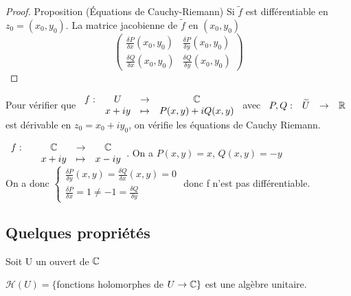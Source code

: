 \documentclass[]{report}
\begin{document}
\begin{proof}{Proposition (Équations de Cauchy-Riemann)}{}
    Si $\widetilde{f}$ est différentiable en $z_0=(x_0,y_0)$. La matrice jacobienne de $\widetilde{f}$ en $(x_0,y_0)$\\
    \[\begin{pmatrix}
\frac{\delta P}{\delta x}(x_0,y_0) & \frac{\delta P}{\delta y}(x_0,y_0) \\
\frac{\delta Q}{\delta x}(x_0,y_0) & \frac{\delta Q}{\delta y}(x_0,y_0)
    \end{pmatrix}\]
\end{proof}

\begin{re}{}{}
    Pour vérifier que $\begin{array}{ccccc}
f : & U & \to & \mathbb{C} \\
  & x+iy & \mapsto & P (x, y) + iQ (x, y)
\end{array}$ avec $\begin{array}{ccccc}P,Q  : & \widetilde{U} & \to & \mathbb{R}\end{array}$ est dérivable en $z_0=x_0+iy_0$, on vérifie les équations de Cauchy Riemann.
\end{re}

\begin{ex}{}{}
    $\begin{array}{ccccc} f : & & \mathbb{C} & \to & \mathbb{C} \\ & & x+iy & \mapsto & x-iy \end{array}$. On a $P(x,y)=x$, $Q(x,y)=-y$\\
On a donc $\begin{cases} \frac{\delta P}{\delta y}(x,y)=\frac{\delta Q}{\delta x}(x,y)=0\\ \frac{\delta P}{\delta x}=1 \neq -1 = \frac{\delta Q}{\delta y} \end{cases}$ donc f n'est pas différentiable.
\end{ex}

\subsection{Quelques propriétés}

Soit U un ouvert de $\mathbb{C}$

\begin{df}{}{}
    $\mathcal{H}(U)=\{$fonctions holomorphes de $U \to \mathbb{C} \}$ est une algèbre unitaire.
\end{df}
\end{document}
